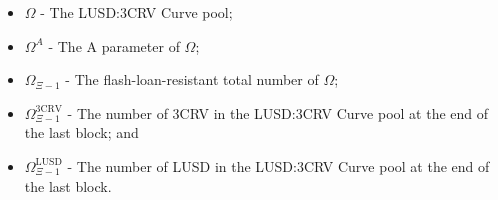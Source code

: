 \documentclass[class=article, crop=false]{standalone}
\begin{document}
\begin{itemize}[topsep=0pt, itemsep=3pt,leftmargin=16pt]
    \item[] $\Omega$ - The LUSD:3CRV Curve pool;
    \item[] $\Omega^{A}$ - The A parameter of $\Omega$;
    \item[] $\Omega_{\Xi-1}$ - The flash-loan-resistant total number of $\Omega$;
    \item[] $\Omega_{\Xi-1}^{\text{3CRV}}$ - The number of 3CRV in the LUSD:3CRV Curve pool at the end of the last block; and
    \item[] $\Omega_{\Xi-1}^{\text{LUSD}}$ - The number of LUSD in the LUSD:3CRV Curve pool at the end of the last block.
\end{itemize}
\end{document}
